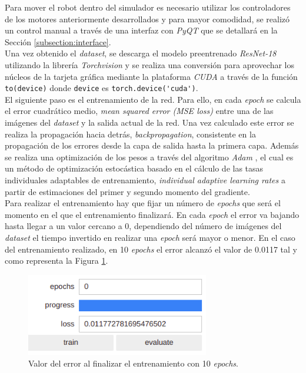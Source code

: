 Para mover el robot dentro del simulador es necesario utilizar los controladores de los motores anteriormente desarrollados y para mayor comodidad, se realizó un control manual a
través de una interfaz con \textit{PyQT} que se detallará en la Sección \ref{subsection:interface}.\\

Una vez obtenido el \textit{dataset}, se descarga el modelo preentrenado \textit{ResNet-18} utilizando la librería \textit{Torchvision} y se realiza una conversión para aprovechar
los núcleos de la tarjeta gráfica mediante la plataforma \textit{CUDA} a través de la función \verb|to(device)| donde \verb|device| es \verb|torch.device('cuda')|.\\

El siguiente paso es el entrenamiento de la red. Para ello, en cada \textit{epoch} se calcula el error cuadrático medio, \textit{mean squared error (MSE loss)} entre una de las
imágenes del \textit{dataset} y la salida actual de la red. Una vez calculado este error se realiza la propagación hacia detrás, \textit{backpropagation}, consistente en la
propagación de los errores desde la capa de salida hasta la primera capa. Además se realiza una optimización de los pesos a través del algoritmo \textit{Adam} \cite{adam}, el cual
es un método de optimización estocástica basado en el cálculo de las tasas individuales adaptables de entrenamiento, \textit{individual adaptive learning rates} a partir de
estimaciones del primer y segundo momento del gradiente.\\

Para realizar el entrenamiento hay que fijar un número de \textit{epochs} que será el momento en el que el entrenamiento finalizará. En cada \textit{epoch} el error va bajando
hasta llegar a un valor cercano a 0, dependiendo del número de imágenes del \textit{dataset} el tiempo invertido en realizar una \textit{epoch} será mayor o menor. En el caso del
entrenamiento realizado, en 10 \textit{epochs} el error alcanzó el valor de 0.0117 tal y como representa la Figura \ref{fig:epochsimulator}.\\

\begin{figure} [h!]
	\begin{center}
		\includegraphics[width=8cm]{figs/epochSimulator}
	\end{center}
	\caption{Valor del error al finalizar el entrenamiento con 10 \textit{epochs}.}
	\label{fig:epochsimulator}
\end{figure}\

